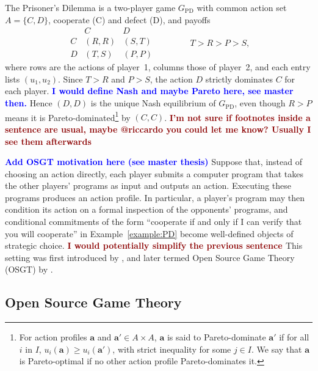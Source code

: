 \documentclass[twoside,11pt]{article}
\newcommand{\boldred}[1]{\textbf{\textcolor{darkred}{#1}}}
\newcommand{\boldblue}[1]{\textbf{\textcolor{blue}{#1}}}
\begin{document}
\begin{example}\label{example:PD}
The Prisoner's Dilemma is a two-player game $G_{\mathrm{PD}}$ with common action set $A = \{C, D\}$, cooperate (C) and defect (D), and payoffs
  \[
    \begin{array}{c|cc}
         & C     & D     \\ \hline
       C & (R,R) & (S,T) \\
       D & (T,S) & (P,P)
    \end{array}
    \qquad\qquad T > R > P > S,
  \]
  where rows are the actions of player~1, columns those of player~2, and each entry lists $(u_1, u_2)$.  Since $T > R$ and $P > S$, the action $D$ strictly dominates $C$ for each player. \boldblue{I would define Nash and maybe Pareto here, see master then.} Hence $(D,D)$ is the unique Nash equilibrium of $G_{\mathrm{PD}}$, even though $R > P$ means it is Pareto-dominated\footnote{For action profiles $\bm{a}$ and $\bm{a}' \in A \times A$, $\bm{a}$ is said to Pareto-dominate $\bm{a'}$ if for all $i$ in $I$, $u_i(\bm{a}) \ge u_i(\bm{a}')$, with strict inequality for some $j \in I$.  We say that $\bm{a}$ is Pareto-optimal if no other action profile Pareto-dominates it.} by $(C,C)$. \boldred{I'm not sure if footnotes inside a sentence are usual, maybe @riccardo you could let me know? Usually I see them afterwards}
\end{example}

\boldblue{Add OSGT motivation here (see master thesis)}
Suppose that, instead of choosing an action directly, each player submits a computer program that takes the other players' programs as input and outputs an action. Executing these programs produces an action profile. In particular, a player's program may then condition its action on a formal inspection of the opponents' programs, and conditional commitments of the form ``cooperate if and only if I can verify that you will cooperate'' in Example~\ref{example:PD} become well-defined objects of strategic choice. \boldred{I would potentially simplify the previous sentence } This setting was first introduced by \cite{tennenholtz2004program}, and later termed Open Source Game Theory (OSGT) by \cite{Critch}.

\subsection{Open Source Game Theory}\label{sec:osgt}
\end{document}
